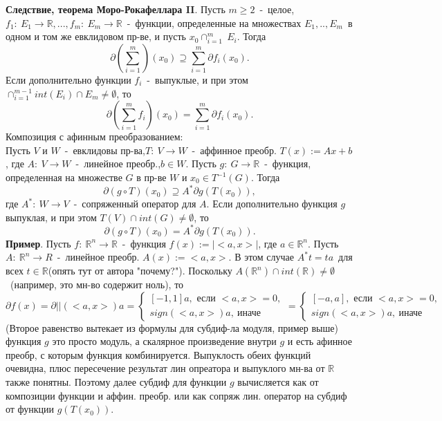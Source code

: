 \textbf{Следствие, теорема Моро-Рокафеллара II}. Пусть $m \geq 2$~-~целое, $f_1:~E_1 \to \mathbb{R},...,f_m:~E_m \to \mathbb{R}$~-~функции, определенные на множествах $E_1,..,E_m$~в одном и том же евклидовом пр-ве, и пусть $x_0 \cap^m_{i=1}~E_i$. Тогда
$$
\partial \left( \sum^{m}_{i=1}\right)(x_0) \supseteq \sum^{m}_{i=1}\partial f_i(x_0).
$$
Если дополнительно функции $f_i$~-~выпуклые, и при этом $\cap^{m-1}_{i=1} int(E_i) \cap E_m \neq \emptyset$, то
$$
\partial \left(\sum^{m}_{i=1} f_i\right)(x_0)=\sum^{m}_{i=1}\partial f_i(x_0).
$$
Композиция с афинным преобразованием:\\
Пусть $V$ и $W$~-~евклидовы пр-ва,$T:~V \to W$~-~аффинное преобр. $T(x):=Ax+b$, где $A:~V \to W$~-~линейное преобр.,$b \in W$. Пусть $g:~G \to \mathbb{R}$~-~функция, определенная на множестве $G$ в пр-ве $W$ и $x_0 \in T^{-1}(G)$. Тогда
$$
\partial (g \circ T)(x_0) \supseteq A^{*}\partial g(T(x_0)),
$$
где $A^{*}:~W \to V$~-~сопряженный оператор для $A$. Если дополнительно функция $g$ выпуклая, и при этом $T(V) \cap int(G)\neq \emptyset$, то
$$
\partial (g \circ T)(x_0)=A^{*}\partial g(T(x_0)).
$$
\textbf{Пример}. Пусть $f:~\mathbb{R}^n \to \mathbb{R}$~-~функция $f(x):=|<a,x>|$, где $a \in \mathbb{R}^n$. Пусть $A:~\mathbb{R}^n \to R$~-~линейное преобр. $A(x):=<a,x>$. В этом случае $A^{*}t=ta$~для всех $t \in \mathbb{R}$(опять тут от автора "почему?"). Поскольку $A(\mathbb{R}^n) \cap int(\mathbb{R})\neq \emptyset$~(например, это мн-во содержит ноль), то
$$
\partial f(x)=\partial ||(<a,x>)a=\begin{cases}
[-1,1]
                                  a,\text{~если~}<a,x>=0,\\
                                  {sign(<a,x>)a},~\text{иначе}
\end{cases} = \begin{cases}
[-a,a]
              ,\text{~если~}<a,x>=0,\\
              {sign(<a,x>)a},~\text{иначе}
\end{cases}
$$
(Второе равенство вытекает из формулы для субдиф-ла модуля, пример выше)\\
функция $g$ это просто модуль, а скалярное произведение внутри $g$ и есть афинное преобр, с которым функция комбинируется. Выпуклость обеих функций очевидна, плюс пересечение результат лин опреатора и выпуклого мн-ва от $\mathbb{R}$ также понятны. Поэтому далее субдиф для функции $g$ вычисляется как от композиции функции и аффин. преобр. или как сопряж лин. оператор на субдиф от функции $g(T(x_0))$.\\

